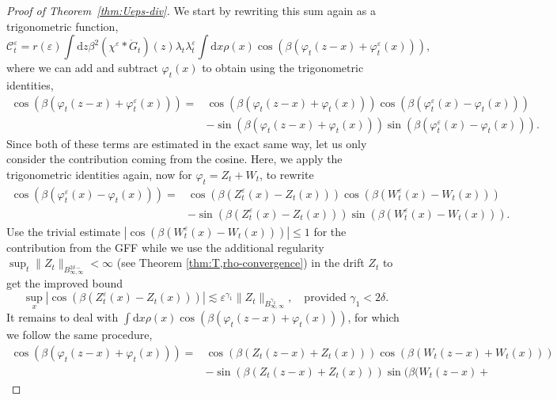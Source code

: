 \documentclass[11pt, a4paper]{scrartcl}
\numberwithin{equation}{section}
\theoremstyle{plain}
\theoremstyle{remark}
\newcommand{\mathd}{\mathrm{d}}
\newcommand{\tmtextbf}[1]{\text{{\bfseries{#1}}}}
\begin{document}
\begin{proof}[Proof of Theorem~\ref{thm:Ueps-div}]
  \tmtextbf{($\mathcal{C}^{\varepsilon}_t$).} We start by rewriting this sum
  again as a trigonometric function,
  \[ \mathcal{C}^{\varepsilon}_t = r (\varepsilon) \int \mathd z \beta^2
     (\chi^{\varepsilon} \ast \dot{G}_t ) (z) \lambda_t
     \lambda_t^{\varepsilon} \int \mathd x \rho (x) \cos (\beta (\varphi_t (z
     - x) + \varphi_t^{\varepsilon} (x))), \]
  where we can add and subtract $\varphi_t (x)$ to obtain using the
  trigonometric identities,
  \[ \begin{aligned}
       \cos (\beta (\varphi_t (z - x) + \varphi_t^{\varepsilon} (x))) = &
       \cos (\beta (\varphi_t (z - x) + \varphi_t (x))) \cos (\beta
       (\varphi_t^{\varepsilon} (x) - \varphi_t (x)))\\
       & - \sin (\beta (\varphi_t (z - x) + \varphi_t (x))) \sin (\beta
       (\varphi_t^{\varepsilon} (x) - \varphi_t (x))) .
     \end{aligned} \]
  Since both of these terms are estimated in the exact same way, let us only
  consider the contribution coming from the cosine. Here, we apply the
  trigonometric identities again, now for $\varphi_t = Z_t + W_t$, to rewrite
  \[ \begin{aligned}
       \cos (\beta (\varphi_t^{\varepsilon} (x) - \varphi_t (x))) =& \cos
       (\beta (Z_t^{\varepsilon} (x) - Z_t (x))) \cos (\beta
       (W_t^{\varepsilon} (x) - W_t (x)))\\
       & - \sin (\beta (Z_t^{\varepsilon} (x) - Z_t (x))) \sin (\beta
       (W_t^{\varepsilon} (x) - W_t (x))) .
     \end{aligned} \]
  Use the trivial estimate $| \cos (\beta (W_t^{\varepsilon} (x) - W_t (x))) |
  \leqslant 1$ for the contribution from the GFF while we use the additional
  regularity $\sup_t \| Z_t \|_{B_{\infty, \infty}^{2 \delta -}} < \infty$
  (see Theorem \ref{thm:T,rho-convergence}) in the drift $Z_t$ to get the
  improved bound
  \[ \sup_x  | \cos (\beta (Z_t^{\varepsilon} (x) - Z_t (x))) | \lesssim
     \varepsilon^{\gamma_1} \| Z_t \|_{B^{\gamma_2}_{\infty, \infty}}, \quad
     \text{provided } \gamma_1 < 2 \delta . \]
  It remains to deal with $\int \mathd x \rho (x) \cos (\beta (\varphi_t (z -
  x) + \varphi_t (x)))$, for which we follow the same procedure,
  \[ \begin{aligned}
       \cos (\beta (\varphi_t (z - x) + \varphi_t (x))) = & \cos (\beta (Z_t
       (z - x) + Z_t (x))) \cos (\beta (W_t (z - x) + W_t (x)))\\
       & - \sin (\beta (Z_t (z - x) + Z_t (x))) \sin (\beta (W_t (z - x) +

\end{aligned}\]
\end{proof}
\end{document}
